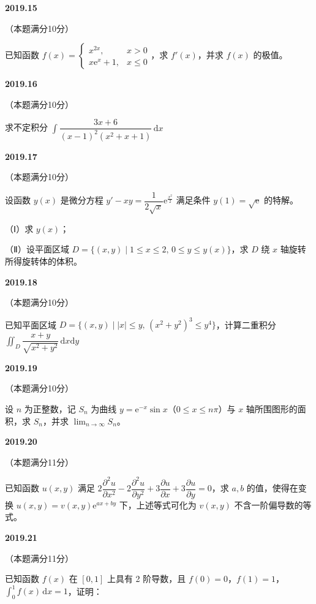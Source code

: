 \documentclass[UTF8,12pt,fontset=windows]{ctexart}
\begin{document}
\vfill
\newpage
{\large\bfseries 2019.15}

（本题满分10分）

已知函数 $f(x) = \begin{cases} x^{2x}, & x > 0 \\ x\mathrm{e}^x + 1, & x \leqslant 0 \end{cases}$，求 $f'(x)$，并求 $f(x)$ 的极值。

\vfill
\newpage
{\large\bfseries 2019.16}

（本题满分10分）

求不定积分 $\int \dfrac{3x+6}{(x-1)^2(x^2+x+1)}\,\mathrm{d}x$

\vfill
\newpage
{\large\bfseries 2019.17}

（本题满分10分）

设函数 $y(x)$ 是微分方程 $y' - xy = \dfrac{1}{2\sqrt{x}}\mathrm{e}^{\frac{x^2}{2}}$ 满足条件 $y(1) = \sqrt{\mathrm{e}}$ 的特解。

（Ⅰ）求 $y(x)$；

（Ⅱ）设平面区域 $D = \{(x,y) \mid 1 \leqslant x \leqslant 2,\, 0 \leqslant y \leqslant y(x)\}$，求 $D$ 绕 $x$ 轴旋转所得旋转体的体积。

\vfill
\newpage
{\large\bfseries 2019.18}

（本题满分10分）

已知平面区域 $D = \{(x,y) \mid |x| \leqslant y,\, (x^2+y^2)^3 \leqslant y^4\}$，计算二重积分 $\iint_D \dfrac{x+y}{\sqrt{x^2+y^2}}\,\mathrm{d}x\mathrm{d}y$

\vfill
\newpage
{\large\bfseries 2019.19}

（本题满分10分）

设 $n$ 为正整数，记 $S_n$ 为曲线 $y = \mathrm{e}^{-x}\sin x$（$0 \leqslant x \leqslant n\pi$）与 $x$ 轴所围图形的面积，求 $S_n$，并求 $\lim_{n\to\infty} S_n$。

\vfill
\newpage
{\large\bfseries 2019.20}

（本题满分11分）

已知函数 $u(x,y)$ 满足 $2\dfrac{\partial^2 u}{\partial x^2} - 2\dfrac{\partial^2 u}{\partial y^2} + 3\dfrac{\partial u}{\partial x} + 3\dfrac{\partial u}{\partial y} = 0$，求 $a, b$ 的值，使得在变换 $u(x,y) = v(x,y)\mathrm{e}^{ax+by}$ 下，上述等式可化为 $v(x,y)$ 不含一阶偏导数的等式。

\vfill
\newpage
{\large\bfseries 2019.21}

（本题满分11分）

已知函数 $f(x)$ 在 $[0,1]$ 上具有 2 阶导数，且 $f(0) = 0$，$f(1) = 1$，$\int_{0}^{1} f(x)\,\mathrm{d}x = 1$，证明：
\end{document}
